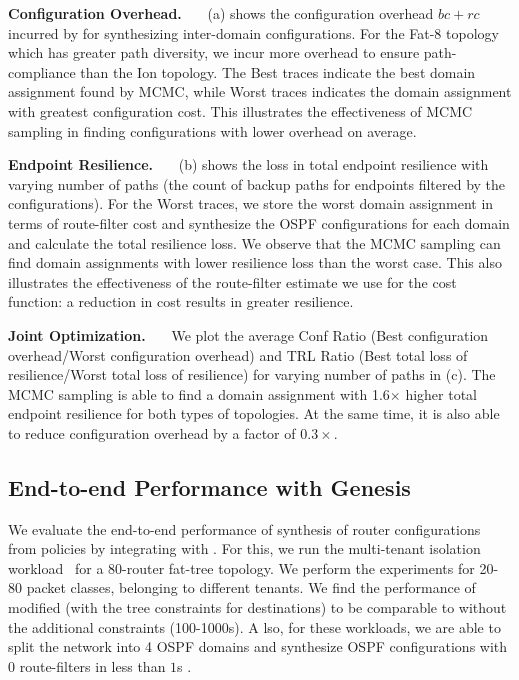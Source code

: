 \noindent\textbf{Configuration Overhead.}~~~
(a) shows the configuration overhead $bc + rc$ 
incurred by \name for synthesizing inter-domain configurations.
For the Fat-8 topology which has greater path diversity, we incur more 
overhead to ensure path-compliance than the Ion topology. 
The Best traces indicate the best domain assignment found by MCMC, while 
Worst traces indicates the domain assignment with greatest 
configuration cost. 
This illustrates
the effectiveness of MCMC sampling in finding configurations with lower overhead on average.

\noindent\textbf{Endpoint Resilience.}~~~ (b) shows
the loss in total endpoint resilience with varying number of paths
(the count of backup paths for endpoints filtered by the
configurations). For the Worst traces, we store the worst domain
assignment in terms of route-filter cost and synthesize the OSPF
configurations for each domain and calculate the total resilience
loss. We observe that the MCMC sampling can find domain assignments
with lower resilience loss than the worst case. This also illustrates
the effectiveness of the route-filter estimate we use for the cost
function: a reduction in cost results in greater resilience.

\noindent\textbf{Joint Optimization.}~~~
We plot the average Conf Ratio 
(Best configuration overhead/Worst configuration overhead) and TRL
Ratio (Best total loss of resilience/Worst total loss of resilience)
for varying number of paths in (c). The MCMC
sampling is able to find a domain assignment
with 1.6$\times$ higher total endpoint resilience for both types
of topologies. At the same time, it is also able to reduce configuration
overhead by a factor of $0.3\times$. 


\subsection{End-to-end Performance with Genesis} \label{sec:genzep}
We evaluate the end-to-end performance 
of synthesis of router configurations from policies 
by integrating \name with \genesis. For this, we run
the multi-tenant isolation workload~\cite{genesis} for
a 80-router fat-tree topology. We perform the experiments
for 20-80 packet classes, belonging to different tenants. 
We find the performance of modified \genesis (with the tree
constraints for destinations) to be comparable to \genesis 
without the additional constraints (100-1000s). A
lso, for these workloads, we are able to 
split the network into 4 OSPF domains and synthesize OSPF
configurations with 0 route-filters in less than $1$s .
